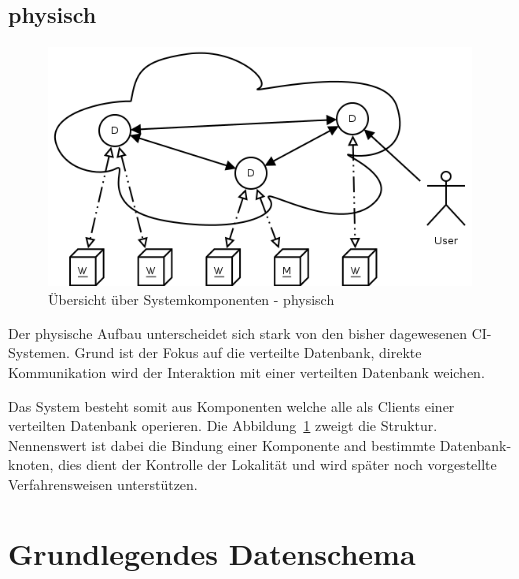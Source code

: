 \subsection{physisch}

\begin{figure}[ht] 
  \centering
  \label{fig:grob-layout-komponenten}
  \includegraphics[width=\textwidth]{imageinput/grob-layout-komponenten.png}
  \caption{Übersicht über Systemkomponenten - physisch}
\end{figure}

Der physische Aufbau unterscheidet sich stark von den bisher dagewesenen CI-Systemen.
Grund ist der Fokus auf die verteilte Datenbank, direkte Kommunikation
wird der Interaktion mit einer verteilten Datenbank weichen.

Das System besteht somit aus Komponenten welche alle als Clients einer verteilten Datenbank operieren.
Die Abbildung~\ref{fig:grob-layout-komponenten} zweigt die Struktur.
Nennenswert ist dabei die Bindung einer Komponente and bestimmte Datenbank-knoten,
dies dient der Kontrolle der Lokalität und wird später noch vorgestellte Verfahrensweisen unterstützen.


\section{Grundlegendes Datenschema}


